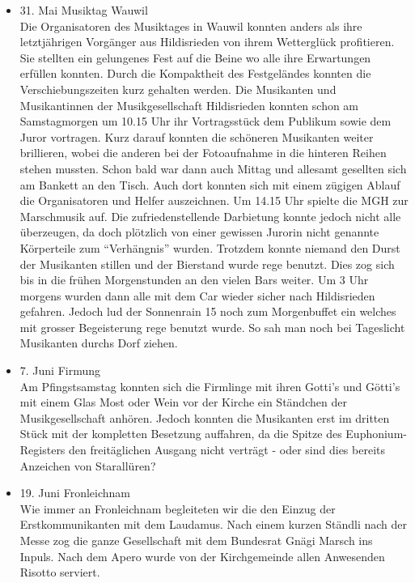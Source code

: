\begin{history}
\begin{itemize}
        \item 31. Mai Musiktag Wauwil\\
              Die Organisatoren des Musiktages in Wauwil konnten anders als ihre
              letztjährigen  Vorgänger aus Hildisrieden von ihrem Wetterglück
              profitieren. Sie stellten ein gelungenes Fest auf die Beine wo alle ihre
              Erwartungen erfüllen konnten. Durch die Kompaktheit des Festgeländes
              konnten die Verschiebungszeiten kurz gehalten werden. Die Musikanten und
              Musikantinnen der Musikgesellschaft Hildisrieden konnten schon am
              Samstagmorgen um 10.15 Uhr ihr Vortragsstück dem Publikum sowie dem
              Juror vortragen. Kurz darauf konnten die schöneren Musikanten weiter
              brillieren, wobei die anderen bei der Fotoaufnahme in die hinteren
              Reihen stehen mussten. Schon bald war dann auch Mittag und allesamt
              gesellten sich am Bankett an den Tisch. Auch dort konnten sich mit einem
              zügigen Ablauf die Organisatoren und Helfer auszeichnen. Um 14.15 Uhr
              spielte die MGH zur Marschmusik auf. Die zufriedenstellende Darbietung
              konnte jedoch nicht alle überzeugen, da doch plötzlich von einer
              gewissen Jurorin nicht genannte Körperteile zum \enquote{Verhängnis}
              wurden. Trotzdem konnte niemand den Durst der Musikanten stillen und der
              Bierstand wurde rege benutzt. Dies zog sich bis in die frühen
              Morgenstunden an den vielen Bars weiter.  Um 3 Uhr morgens wurden dann
              alle mit dem Car wieder sicher nach Hildisrieden gefahren. Jedoch lud
              der Sonnenrain 15 noch zum Morgenbuffet ein welches mit grosser
              Begeisterung rege benutzt wurde. So sah man noch bei Tageslicht
              Musikanten durchs Dorf ziehen.

        \item 7. Juni Firmung\\
              Am Pfingstsamstag konnten sich die Firmlinge mit ihren Gotti's und
              Götti's mit einem Glas Most oder Wein vor der Kirche ein Ständchen der
              Musikgesellschaft anhören. Jedoch konnten die Musikanten erst im dritten
              Stück mit der kompletten Besetzung auffahren, da die Spitze des
              Euphonium-Registers den freitäglichen Ausgang nicht verträgt - oder sind
              dies bereits Anzeichen von Starallüren?

        \item 19. Juni Fronleichnam\\
              Wie immer an Fronleichnam begleiteten wir die den Einzug der
              Erstkommunikanten mit dem Laudamus. Nach einem kurzen Ständli nach der
              Messe zog die ganze Gesellschaft mit dem Bundesrat Gnägi Marsch ins
              Inpuls. Nach dem Apero wurde von der Kirchgemeinde allen Anwesenden
              Risotto serviert.


\end{itemize}
\end{history}

